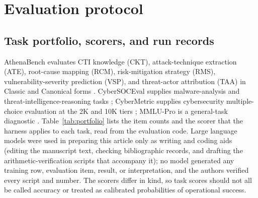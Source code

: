 \documentclass[twocolumn]{svjour3}
\begin{document}
\section{Evaluation protocol}\label{sec:evaluation}
\subsection{Task portfolio, scorers, and run records}
AthenaBench evaluates CTI knowledge (CKT), attack-technique extraction (ATE), root-cause mapping (RCM), risk-mitigation strategy (RMS), vulnerability-severity prediction (VSP), and threat-actor attribution (TAA) in Classic and Canonical forms \cite{alam2025athenabench}. CyberSOCEval supplies malware-analysis and threat-intelligence-reasoning tasks \cite{deason2025cybersoceval}; CyberMetric supplies cybersecurity multiple-choice evaluation at the 2K and 10K tiers \cite{tihanyi2024cybermetric}; MMLU-Pro is a general-task diagnostic \cite{wang2024mmlupro}. Table~\ref{tab:portfolio} lists the item counts and the scorer that the harness applies to each task, read from the evaluation code. Large language models were used in preparing this article only as writing and coding aids (editing the manuscript text, checking bibliographic records, and drafting the arithmetic-verification scripts that accompany it); no model generated any training row, evaluation item, result, or interpretation, and the authors verified every script and number. The scorers differ in kind, so task scores should not all be called accuracy or treated as calibrated probabilities of operational success.
\end{document}

